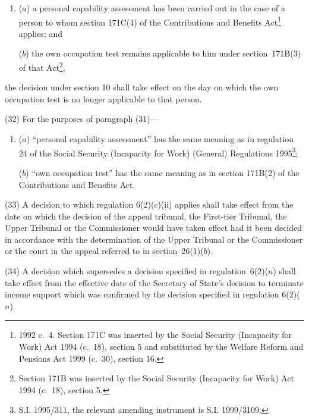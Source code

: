 \documentclass[12pt,a4paper]{article}
\begin{document}
\begin{enumerate}\item[]
($a$) a personal capability assessment has been carried out in the case of a person to whom section 171C(4) of the Contributions and Benefits Act\footnote{1992 c.\ 4. Section 171C was inserted by the Social Security (Incapacity for Work) Act 1994 (c.\ 18), section 5 and substituted by the Welfare Reform and Pensions Act 1999 (c.\ 30), section 16.} applies; and

($b$) the own occupation test remains applicable to him under section~171B(3) of that Act\footnote{Section 171B was inserted by the Social Security (Incapacity for Work) Act 1994 (c.\ 18), section 5.},
\end{enumerate}
the decision under section 10 shall take effect on the day 
on which the own occupation test is no longer applicable to that person.

(32) For the purposes of paragraph (31)—
\begin{enumerate}\item[]
($a$) “personal capability assessment” has the same meaning as in regulation 24 of the Social Security (Incapacity for Work) (General) Regulations 1995\footnote{S.I. 1995/311, the relevant amending instrument is S.I. 1999/3109.};

($b$) “own occupation test” has the same meaning as in section 171B(2) of the Contributions and Benefits Act.
\end{enumerate}

(33) A decision to which regulation 6(2)($c$)(ii)  applies shall take effect from the date on which 
the decision of the appeal tribunal, the First-tier Tribunal, the Upper Tribunal or the Commissioner  %
would have taken effect had it been decided in accordance with the determination of the 
Upper Tribunal  %
or the Commissioner  %
or the court in the appeal referred to in section~26(1)($b$).

\begin{sloppypar}
(34) A decision which supersedes a decision specified in regulation~6(2)($n$)  shall take effect from the effective date of the Secretary of State’s decision to terminate income support which was confirmed by the decision specified in regulation 6(2)($n$).
\end{sloppypar}
\end{document}
